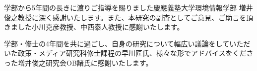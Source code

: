\begin{acknowledgment}

学部から5年間の長きに渡りご指導を賜りました慶應義塾大学環境情報学部 増井俊之教授に深く感謝いたします。また、本研究の副査としてご意見、ご助言を頂きました小川克彦教授、中西泰人教授に感謝いたします。

学部・修士の4年間を共に過ごし、自身の研究について幅広い議論をしていただいた政策・メディア研究科修士課程の早川匠氏、様々な形でアドバイスをくださった増井俊之研究会OB諸氏に感謝いたします。

\end{acknowledgment}
